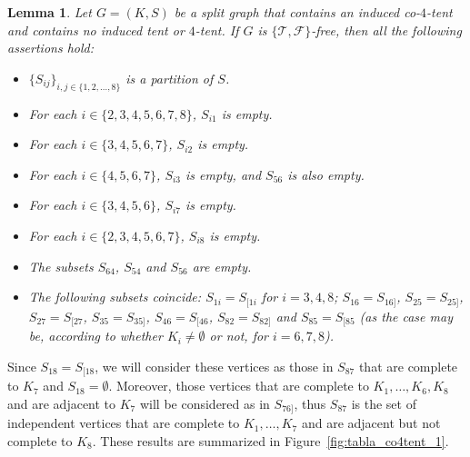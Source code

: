 \documentclass[12pt]{book}
\theoremstyle{plain}
\newtheorem{lema}[teo]{Lemma}
\theoremstyle{remark}
\begin{document}
\begin{lema} \label{lema:co4tent_1} 
Let $G=(K,S)$ be a split graph that contains an induced co-$4$-tent and contains no induced tent or $4$-tent. If $G$ is $\{ \mathcal{T}, \mathcal{F} \}$-free, then all the following assertions hold:
 \begin{itemize}
  \item $\{S_{ij}\}_{i,j\in\{1,2,\ldots,8\}}$ is a partition of $S$.
  \item For each $i\in\{2,3,4,5,6,7,8 \}$, $S_{i1}$ is empty.
  \item For each $i\in\{3,4,5,6,7 \}$, $S_{i2}$ is empty.
  \item For each $i\in\{4,5,6,7 \}$, $S_{i3}$ is empty, and $S_{56}$ is also empty.
  \item For each $i\in\{3,4,5,6 \}$, $S_{i7}$ is empty.
  \item For each $i\in\{2,3,4,5,6,7 \}$, $S_{i8}$ is empty.
  \item The subsets $S_{64}$, $S_{54}$ and $S_{56}$ are empty.
  \item The following subsets coincide: $S_{1i}= S_{[1i}$ for $i=3,4,8$;
  $S_{16}=S_{16]}$, $S_{25}=S_{25]}$, $S_{27}=S_{[27}$, $S_{35}=S_{35]}$, $S_{46} = S_{[46}$, $S_{82} = S_{82]}$ and $S_{85} = S_{[85}$ (as the case may be, according to whether $K_i \neq \emptyset$ or not, for $i=6,7,8$).
 \end{itemize}
 
\end{lema}

 
Since $S_{18} = S_{[18}$, we will consider these vertices as those in $S_{87}$ that are complete to $K_7$ and $S_{18} = \emptyset$. Moreover, those vertices that are complete to $K_1, \ldots, K_6, K_8$ and are adjacent to $K_7$ will be considered as in $S_{76]}$, thus $S_{87}$ is the set of independent vertices that are complete to $K_1, \ldots, K_7$ and are adjacent but not complete to $K_8$. These results are summarized in Figure~\ref{fig:tabla_co4tent_1}.
 
\end{document}
